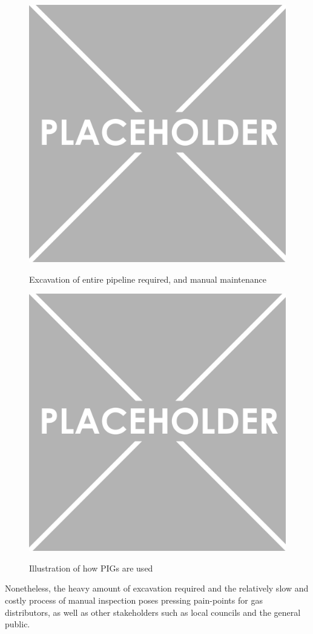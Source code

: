 \documentclass[11pt]{article}		%
\newlength{\imageheight}	 %
\begin{document}
\begin{figure}[h]
			\centering
			\begin{multicols}{2}
				\includegraphics[height=\imageheight]{placeholder}
				\caption{Excavation of entire pipeline required, and manual maintenance}
				\label{placeholder}
				\columnbreak
				\includegraphics[height=\imageheight]{placeholder}
				\caption{Illustration of how PIGs are used}
				\label{placeholder}
			\end{multicols}
		\end{figure}
Nonetheless, the heavy amount of excavation required and the relatively slow and costly process of manual inspection poses pressing pain-points for gas distributors, as well as other stakeholders such as local councils and the general public. 
\end{document}
